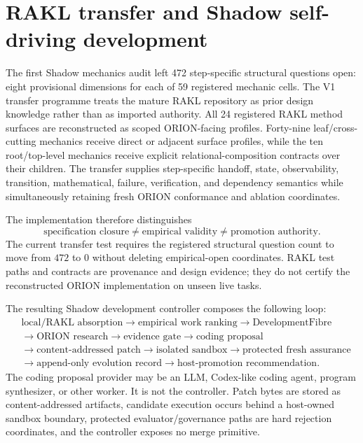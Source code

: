 \section{RAKL transfer and Shadow self-driving development}
The first Shadow mechanics audit left 472 step-specific structural questions open: eight provisional dimensions for each of 59 registered mechanic cells.  The V1 transfer programme treats the mature RAKL repository as prior design knowledge rather than as imported authority.  All 24 registered RAKL method surfaces are reconstructed as scoped ORION-facing profiles.  Forty-nine leaf/cross-cutting mechanics receive direct or adjacent surface profiles, while the ten root/top-level mechanics receive explicit relational-composition contracts over their children.  The transfer supplies step-specific handoff, state, observability, transition, mathematical, failure, verification, and dependency semantics while simultaneously retaining fresh ORION conformance and ablation coordinates.

The implementation therefore distinguishes
\[
\text{specification closure} \neq \text{empirical validity} \neq \text{promotion authority}.
\]
The current transfer test requires the registered structural question count to move from $472$ to $0$ without deleting empirical-open coordinates.  RAKL test paths and contracts are provenance and design evidence; they do not certify the reconstructed ORION implementation on unseen live tasks.

The resulting Shadow development controller composes the following loop:
\[
\begin{aligned}
&\text{local/RAKL absorption}
\rightarrow \text{empirical work ranking}
\rightarrow \text{DevelopmentFibre}\\
&\rightarrow \text{ORION research}
\rightarrow \text{evidence gate}
\rightarrow \text{coding proposal}\\
&\rightarrow \text{content-addressed patch}
\rightarrow \text{isolated sandbox}
\rightarrow \text{protected fresh assurance}\\
&\rightarrow \text{append-only evolution record}
\rightarrow \text{host-promotion recommendation}.
\end{aligned}
\]
The coding proposal provider may be an LLM, Codex-like coding agent, program synthesizer, or other worker.  It is not the controller.  Patch bytes are stored as content-addressed artifacts, candidate execution occurs behind a host-owned sandbox boundary, protected evaluator/governance paths are hard rejection coordinates, and the controller exposes no merge primitive.

